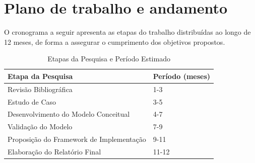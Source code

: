 \chapter{Plano de trabalho e andamento}

O cronograma a seguir apresenta as etapas do trabalho distribuídas ao longo de 12 meses, de forma a assegurar o cumprimento dos objetivos propostos. 

\begin{table}[h!]
    \centering
    \begin{tabular}{ll}
        \toprule
        Etapa da Pesquisa & Período (meses) \\
        \midrule
        Revisão Bibliográfica & 1-3 \\
        Estudo de Caso & 3-5 \\
        Desenvolvimento do Modelo Conceitual & 4-7 \\
        Validação do Modelo & 7-9 \\
        Proposição do Framework de Implementação & 9-11 \\
        Elaboração do Relatório Final & 11-12 \\
        \bottomrule
    \end{tabular}
    \caption{Etapas da Pesquisa e Período Estimado}
\end{table}

